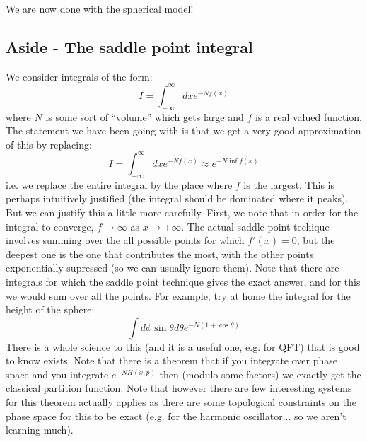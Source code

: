 We are now done with the spherical model!

\subsection{Aside - The saddle point integral}
We consider integrals of the form:
\begin{equation}
    I = \int_{-\infty}^\infty dx e^{-Nf(x)}
\end{equation}
where $N$ is some sort of ``volume'' which gets large and $f$ is a real valued function. The statement we have been going with is that we get a very good approximation of this by replacing:
\begin{equation}
    I = \int_{-\infty}^\infty dx e^{-Nf(x)} \approx e^{-N\inf f(x)}
\end{equation}
i.e. we replace the entire integral by the place where $f$ is the largest. This is perhaps intuitively justified (the integral should be dominated where it peaks). But we can justify this a little more carefully. First, we note that in order for the integral to converge, $f \to \infty$ as $x \to \pm \infty$. The actual saddle point techique involves summing over the all possible points for which $f'(x) = 0$, but the deepest one is the one that contributes the most, with the other points exponentially supressed (so we can usually ignore them). Note that there are integrals for which the saddle point technique gives the exact answer, and for this we would sum over all the points. For example, try at home the integral for the height of the sphere:
\begin{equation}
    \int d\phi \sin\theta d\theta e^{-N(1 + \cos\theta)}
\end{equation}
There is a whole science to this (and it is a useful one, e.g. for QFT) that is good to know exists. Note that there is a theorem that if you integrate over phase space and you integrate $e^{-NH(x, p)}$ then (modulo some factors) we exactly get the classical partition function. Note that however there are few interesting systems for this theorem actually applies as there are some topological constraints on the phase space for this to be exact (e.g. for the harmonic oscillator... so we aren't learning much).

